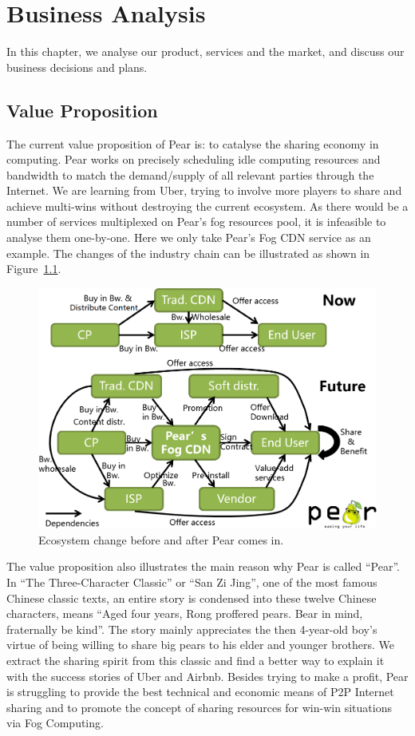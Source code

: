 \chapter{Business Analysis}\label{sec-biz-analysis}
In this chapter, we analyse our product, services and the market, and discuss our business decisions and plans. 

\section{Value Proposition}
The current value proposition of Pear is: to catalyse the sharing economy in computing. Pear works on precisely scheduling idle computing resources and bandwidth to match the demand/supply of all relevant parties through the Internet. We are learning from Uber, trying to involve more players to share and achieve multi-wins without destroying the current ecosystem. As there would be a number of services multiplexed on Pear's fog resources pool, it is infeasible to analyse them one-by-one. Here we only take Pear's Fog CDN service as an example. The changes of the industry chain can be illustrated as shown in Figure~\ref{fig:eco-sys-change}.
\begin{figure}[ht]
	\centering
	\includegraphics[width=.66\textwidth]{fig/biz/eco-system-change.png}
	\caption{Ecosystem change before and after Pear comes in.} \label{fig:eco-sys-change}
\end{figure}

The value proposition also illustrates the main reason why Pear is called ``Pear''. In ``The Three-Character Classic'' or ``San Zi Jing'', one of the most famous Chinese classic texts, an entire story is condensed into these twelve Chinese characters, means ``Aged four years, Rong proffered pears. Bear in mind, fraternally be kind''. The story mainly appreciates the then 4-year-old boy's virtue of being willing to share big pears to his elder and younger brothers. We extract the sharing spirit from this classic and find a better way to explain it with the success stories of Uber and Airbnb. Besides trying to make a profit, Pear is struggling to provide the best technical and economic means of P2P Internet sharing and to promote the concept of sharing resources for win-win situations via Fog Computing. 
